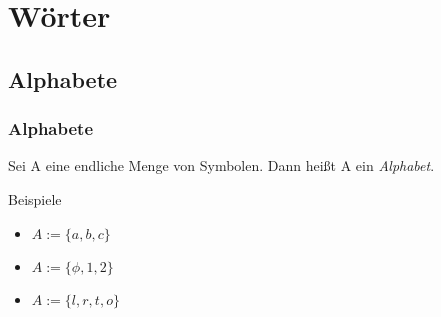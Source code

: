 \section{Wörter}
\subsection{Alphabete}
\begin{frame}
  \frametitle{Alphabete}
  \begin{definition}
    Sei A eine endliche Menge von Symbolen. Dann heißt A ein \emph{Alphabet}.
  \end{definition}
  \begin{exampleblock}{Beispiele}
    \begin{itemize}
      \item $A := \{a, b, c\}$
      \item $A := \{\phi, 1, 2\}$
      \item $A := \{l, r, t, o\}$
    \end{itemize}
  \end{exampleblock}
\end{frame}
